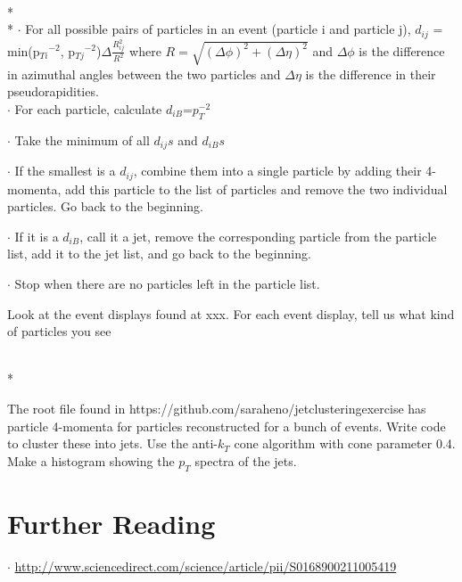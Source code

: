 \\*
\\*
$\cdot$ For all possible pairs of particles in an event (particle i and particle j), $d_{ij}$ = min(p$_{Ti}$$^{-2}$, p$_{Tj}$$^{-2}$)$\Delta\frac{R_{ij}^{2}}{R^{2}}$ where $R=\sqrt{(\Delta\phi)^{2}+(\Delta\eta)^{2}}$ and $\Delta\phi$ is the difference in azimuthal angles between the two particles and $\Delta\eta$ is the difference in their pseudorapidities.
\\
\noindent
$\cdot$ For each particle, calculate $d_{iB}$=$p_{T}^{-2}$

\noindent
$\cdot$ Take the minimum of all $d_{ij}s$ and $d_{iB}s$

\noindent
$\cdot$ If the smallest is a $d_{ij}$, combine them into a single particle by adding their 4-momenta, add this particle to the list of particles and remove the two individual particles.  Go back to the beginning.

\noindent 
$\cdot$ If it is a $d_{iB}$, call it a jet, remove the corresponding particle from the particle list, add it to the jet list, and go back to the beginning.

\noindent
$\cdot$ Stop when there are no particles left in the particle list.
\newpage
\noindent
\vspace{.2cm} 
\begin{minipage}{0.7\textwidth} 
\begin{framed}
\begin{exercise}
{Look at the event displays found at xxx. For each event display, tell us what kind of particles you see}
\end{exercise}
\end{framed} 
\end{minipage}
\vspace{.2cm}
\\*
\vspace{.2cm} 
\begin{minipage}{0.7\textwidth} 
\begin{framed}
\begin{exercise}
{The root file found in https://github.com/saraheno/jetclusteringexercise  has particle 4-momenta for particles reconstructed for a bunch of events. Write code to cluster these into jets. Use the anti-$k_{T}$ cone algorithm with cone parameter 0.4. Make a histogram showing the $p_{T}$ spectra of the jets.}
\end{exercise}
\end{framed} 
\end{minipage}
\vspace{.2cm}

\section{Further Reading}
\noindent
$\cdot$ \url{http://www.sciencedirect.com/science/article/pii/S0168900211005419}
